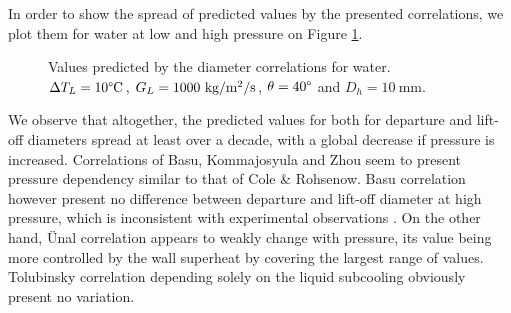 \npar


In order to show the spread of predicted values by the presented correlations, we plot them for water at low and high pressure on Figure \ref{fig:dlo_correl_spread}.




\begin{figure}[h!]


\caption{Values predicted by the diameter correlations for water. $\Delta T_{L}=10\degree\mathrm{C}$, $G_{L}=1000~\text{kg/m$^{2}$/s}$, $\theta=40\degree$ and $D_{h}=10\ $mm.}
\label{fig:dlo_correl_spread}
\end{figure}

\npar

We observe that altogether, the predicted values for both for departure and lift-off diameters spread at least over a decade, with a global decrease if pressure is increased. Correlations of Basu, Kommajosyula and Zhou seem to present pressure dependency similar to that of Cole \& Rohsenow. Basu correlation however present no difference between departure and lift-off diameter at high pressure, which is inconsistent with experimental observations \cite{kossolapov_experimental_2021}. On the other hand, \"Unal correlation appears to weakly change with pressure, its value being more controlled by the wall superheat by covering the largest range of values. Tolubinsky correlation depending solely on the liquid subcooling obviously present no variation.




